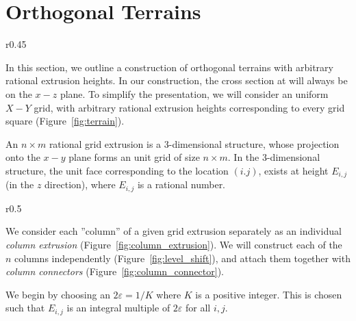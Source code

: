 \section{Orthogonal Terrains}
\label{sec:orthogonal_terrains}

\graphicspath{{./notebooks/}}%
\begin{wrapfigure}[7]{r}{0.45\textwidth}
    \vspace{-2.7em}
    \def\svgwidth{0.45\textwidth}
    
    \caption{Example orthogonal terrain.}
    \label{fig:terrain}
    \vspace{-1.2em}
\end{wrapfigure}
In this section, we outline a construction of orthogonal terrains with arbitrary rational extrusion heights.
In our construction, the cross section at will always be on the $x-z$ plane.
To simplify the presentation, we will consider an uniform $X-Y$ grid,
with arbitrary rational extrusion heights corresponding to every grid square (Figure~\ref{fig:terrain}).
\begin{definition}
An $n\times m$ rational grid extrusion is a 3-dimensional structure,
whose projection onto the $x-y$ plane forms an unit grid of size $n\times m$.
In the 3-dimensional structure, the unit face corresponding to the location $(i.j)$,
exists at height $E_{i,j}$ (in the $z$ direction), where $E_{i,j}$ is a rational number.
\end{definition}

\graphicspath{{./figures/}}
\begin{wrapfigure}[7]{r}{0.5\textwidth}
    \vspace{-2.5em}
    \def\svgwidth{0.5\textwidth}
    \caption{Column extrusion with heights $\left\{ 0,1,3,1,2,0\right\}$.}
    \label{fig:column_extrusion}
    \vspace{-0.8em}
\end{wrapfigure}
We consider each ''column'' of a given grid extrusion separately
as an individual \emph{column extrusion} (Figure~\ref{fig:column_extrusion}).
We will construct each of the $n$ columns independently (Figure~\ref{fig:level_shift}),
and attach them together with \emph{column connectors} (Figure~\ref{fig:column_connector}).

We begin by choosing an $2\varepsilon=1/K$ where $K$ is a positive integer.
This is chosen such that $E_{i,j}$ is an integral multiple of $2\varepsilon$ for all $i,j$.




%
%
